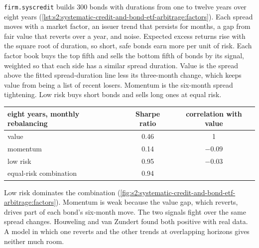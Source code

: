 \texttt{firm.syscredit} builds 300 bonds with durations from one to twelve years over eight years
(\cref{lst:s2:systematic-credit-and-bond-etf-arbitrage:factors}). Each spread moves with a market factor, an issuer trend that persists for months,
a gap from fair value that reverts over a year, and noise. Expected excess returns rise with the square root of duration, so short, safe bonds earn
more per unit of risk. Each factor book buys the top fifth and sells the bottom fifth of bonds by its signal, weighted so that each side has a similar
spread duration. Value is the spread above the fitted spread-duration line less its three-month change, which keeps value from being a list of recent
losers. Momentum is the six-month spread tightening. Low risk buys short bonds and sells long ones at equal risk.

\begin{center}
\small
\begin{tabular}{@{}lcc@{}}
\toprule
eight years, monthly rebalancing & Sharpe ratio & correlation with value\\
\midrule
value & 0.46 & 1\\
momentum & 0.14 & $-0.09$\\
low risk & 0.95 & $-0.03$\\
equal-risk combination & 0.94 &\\
\bottomrule
\end{tabular}
\end{center}

Low risk dominates the combination (\cref{fig:s2:systematic-credit-and-bond-etf-arbitrage:factors}). Momentum is weak because the value gap, which
reverts, drives part of each bond's six-month move. The two signals fight over the same spread changes. Houweling and van Zundert found both
positive with real data. A model in which one reverts and the other trends at overlapping horizons gives neither much room.


